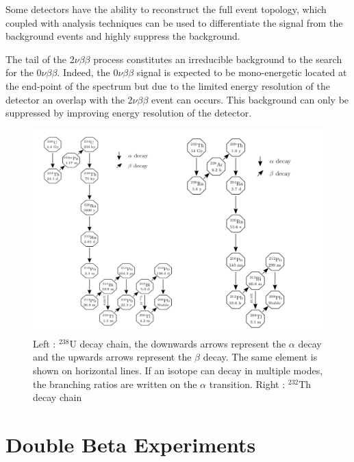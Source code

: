 \documentclass[main.tex]{subfiles}
\begin{document}
\bigskip


\NI Some detectors have the ability to reconstruct the full event topology,  which coupled with analysis techniques can be used to differentiate the signal from the background events and highly suppress the background.


\bigskip


\NI The tail of the 2$\nu\beta\beta$ process constitutes an irreducible background to the search for the 0$\nu\beta\beta$. Indeed, the 0$\nu\beta\beta$ signal is expected to be mono-energetic located at the end-point of the spectrum but due to the limited energy resolution of the detector an overlap with the 2$\nu\beta\beta$ event can occurs. This background can only be suppressed by improving energy resolution of the detector.  


\begin{figure}[h!]
\begin{center}
\includegraphics[scale=0.40]{pictures/Chap2/u238-th232decayChain.pdf}
\caption{Left : $^{238}$U decay chain, the downwards arrows represent the $\alpha$ decay and the upwards arrows represent the $\beta$ decay. The same element is shown on horizontal lines. If an isotope can decay in multiple modes, the branching ratios are written on the $\alpha$ transition. Right : $^{232}$Th decay chain }
\label{u238-th232decayChain}
\end{center}
\end{figure}


\FloatBarrier


\section{Double Beta Experiments}\label{sec:DBDexperiment}
\end{document}
